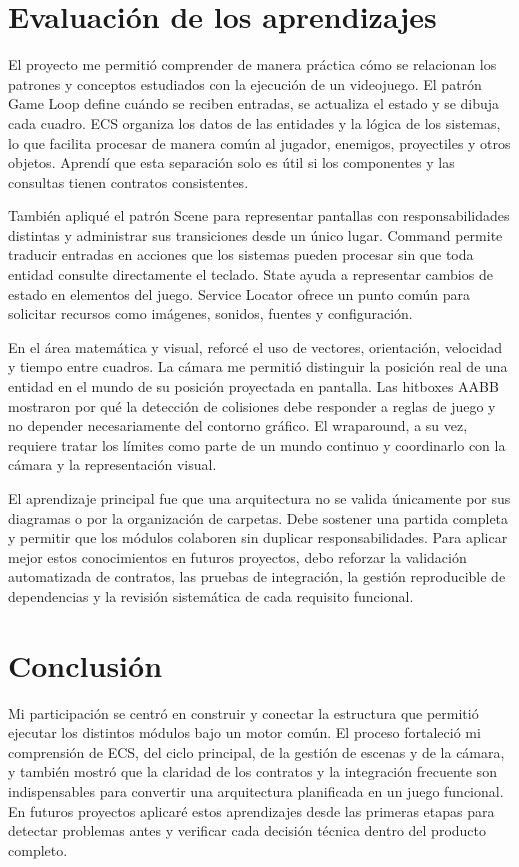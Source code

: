 \documentclass[12pt,letterpaper]{article}
\begin{document}
\section{Evaluación de los aprendizajes}

El proyecto me permitió comprender de manera práctica cómo se relacionan los patrones y conceptos estudiados con la ejecución de un videojuego. El patrón Game Loop define cuándo se reciben entradas, se actualiza el estado y se dibuja cada cuadro. ECS organiza los datos de las entidades y la lógica de los sistemas, lo que facilita procesar de manera común al jugador, enemigos, proyectiles y otros objetos. Aprendí que esta separación solo es útil si los componentes y las consultas tienen contratos consistentes.

También apliqué el patrón Scene para representar pantallas con responsabilidades distintas y administrar sus transiciones desde un único lugar. Command permite traducir entradas en acciones que los sistemas pueden procesar sin que toda entidad consulte directamente el teclado. State ayuda a representar cambios de estado en elementos del juego. Service Locator ofrece un punto común para solicitar recursos como imágenes, sonidos, fuentes y configuración.

En el área matemática y visual, reforcé el uso de vectores, orientación, velocidad y tiempo entre cuadros. La cámara me permitió distinguir la posición real de una entidad en el mundo de su posición proyectada en pantalla. Las hitboxes AABB mostraron por qué la detección de colisiones debe responder a reglas de juego y no depender necesariamente del contorno gráfico. El wraparound, a su vez, requiere tratar los límites como parte de un mundo continuo y coordinarlo con la cámara y la representación visual.

El aprendizaje principal fue que una arquitectura no se valida únicamente por sus diagramas o por la organización de carpetas. Debe sostener una partida completa y permitir que los módulos colaboren sin duplicar responsabilidades. Para aplicar mejor estos conocimientos en futuros proyectos, debo reforzar la validación automatizada de contratos, las pruebas de integración, la gestión reproducible de dependencias y la revisión sistemática de cada requisito funcional.

\section*{Conclusión}

Mi participación se centró en construir y conectar la estructura que permitió ejecutar los distintos módulos bajo un motor común. El proceso fortaleció mi comprensión de ECS, del ciclo principal, de la gestión de escenas y de la cámara, y también mostró que la claridad de los contratos y la integración frecuente son indispensables para convertir una arquitectura planificada en un juego funcional. En futuros proyectos aplicaré estos aprendizajes desde las primeras etapas para detectar problemas antes y verificar cada decisión técnica dentro del producto completo.
\end{document}

